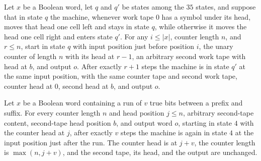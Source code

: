 \begin{lemma}
\label{Complexity.satRed_counterBack}
\leanok
{}
Let $x$ be a Boolean word, let $q$ and $q'$ be states among the $35$ states, and suppose
that in state $q$ the machine, whenever work tape $0$ has a symbol under its head, moves
that head one cell left and stays in state $q$, while otherwise it moves the head one
cell right and enters state $q'$. For any $i\le |x|$, counter length $n$, and $r\le n$,
start in state $q$ with input position just before position $i$, the unary counter of
length $n$ with its head at $r-1$, an arbitrary second work tape with head at $b$, and
output $o$. After exactly $r+1$ steps the machine is in state $q'$ at the same input
position, with the same counter tape and second work tape, counter head at $0$, second
head at $b$, and output $o$.
\end{lemma}

\begin{lemma}
\label{Complexity.satRed_maxOnes}
\leanok
{}
Let $x$ be a Boolean word containing a run of $v$ true bits between a prefix and suffix.
For every counter length $n$ and head position $j\le n$, arbitrary second-tape content,
second-tape head position $b$, and output word $o$, starting in state $4$ with the
counter head at $j$, after exactly $v$ steps the machine is again in state $4$ at the
input position just after the run. The counter head is at $j+v$, the counter length is
$\max(n,j+v)$, and the second tape, its head, and the output are unchanged.
\end{lemma}

